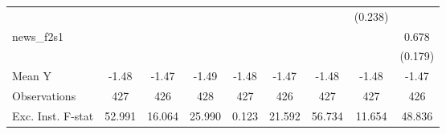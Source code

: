 {\begin{tabular}{l*{8}{c}}
            &                     &                     &                     &                     &                     &                     &     (0.238)         &                     \\
\addlinespace
news\_f2s1   &                     &                     &                     &                     &                     &                     &                     &       0.678\sym{***}\\
            &                     &                     &                     &                     &                     &                     &                     &     (0.179)         \\
\midrule
Mean Y      &       -1.48         &       -1.47         &       -1.49         &       -1.48         &       -1.47         &       -1.48         &       -1.48         &       -1.47         \\
Observations&         427         &         426         &         428         &         427         &         426         &         427         &         427         &         426         \\
Exc. Inst. F-stat&      52.991         &      16.064         &      25.990         &       0.123         &      21.592         &      56.734         &      11.654         &      48.836         \\
\bottomrule
\end{tabular}
}
